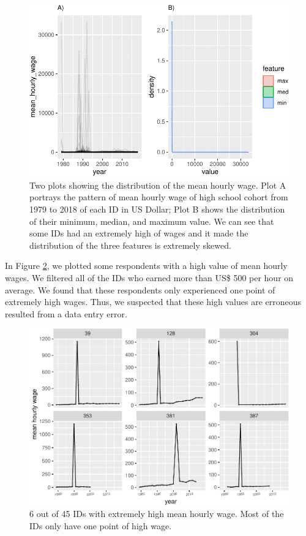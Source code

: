 \documentclass{article}
\begin{document}
\begin{figure}
\centering
\includegraphics{figures/feature-plot-1.pdf}
\caption{\label{fig:feature-plot}Two plots showing the distribution of the mean hourly wage. Plot A portrays the pattern of mean hourly wage of high school cohort from 1979 to 2018 of each ID in US Dollar; Plot B shows the distribution of their minimum, median, and maximum value. We can see that some IDs had an extremely high of wages and it made the distribution of the three features is extremely skewed.}
\end{figure}

In Figure \ref{fig:high-wages}, we plotted some respondents with a high value of mean hourly wages. We filtered all of the IDs who earned more than US\$ 500 per hour on average. We found that these respondents only experienced one point of extremely high wages. Thus, we suspected that these high values are erroneous resulted from a data entry error.

\begin{figure}
\centering
\includegraphics{figures/high-wages-1.pdf}
\caption{\label{fig:high-wages}6 out of 45 IDs with extremely high mean hourly wage. Most of the IDs only have one point of high wage.}
\end{figure}
\end{document}
